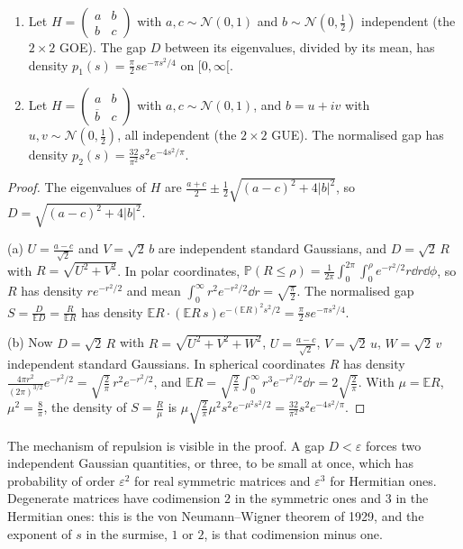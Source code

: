 \begin{proposition}\label{moments:prop:surmise}
\begin{enumerate}[label=(\alph*)]
\item Let $H=\begin{pmatrix}a&b\\b&c\end{pmatrix}$ with $a,c\sim\mathcal N(0,1)$ and $b\sim\mathcal N(0,\frac12)$ independent (the $2\times2$ GOE). The gap $D$ between its
eigenvalues, divided by its mean, has density $p_1(s)=\frac\pi2se^{-\pi s^2/4}$ on $[0,\infty[$.
\item Let $H=\begin{pmatrix}a&b\\\overline b&c\end{pmatrix}$ with $a,c\sim\mathcal N(0,1)$, and $b=u+iv$ with $u,v\sim\mathcal N(0,\frac12)$, all independent (the $2\times2$ GUE).
The normalised gap has density $p_2(s)=\frac{32}{\pi^2}s^2e^{-4s^2/\pi}$.
\end{enumerate}
\end{proposition}
\begin{proof}
The eigenvalues of $H$ are $\frac{a+c}2\pm\frac12\sqrt{(a-c)^2+4|b|^2}$, so $D=\sqrt{(a-c)^2+4|b|^2}$.

(a) $U=\frac{a-c}{\sqrt2}$ and $V=\sqrt2\,b$ are independent standard Gaussians, and $D=\sqrt2\,R$ with $R=\sqrt{U^2+V^2}$. In polar coordinates,
$\mathbb P(R\le\rho)=\frac1{2\pi}\int_0^{2\pi}\!\!\int_0^\rho e^{-r^2/2}r\dd r\dd\phi$, so $R$ has density $re^{-r^2/2}$ and mean
$\int_0^\infty r^2e^{-r^2/2}\dd r=\sqrt{\frac\pi2}$. The normalised gap $S=\frac D{\mathbb ED}=\frac R{\mathbb ER}$ has density
$\mathbb ER\cdot(\mathbb ER\,s)e^{-(\mathbb ER)^2s^2/2}=\frac\pi2se^{-\pi s^2/4}$.

(b) Now $D=\sqrt2\,R$ with $R=\sqrt{U^2+V^2+W^2}$, $U=\frac{a-c}{\sqrt2}$, $V=\sqrt2\,u$, $W=\sqrt2\,v$ independent standard Gaussians. In spherical coordinates
$R$ has density $\frac{4\pi r^2}{(2\pi)^{3/2}}e^{-r^2/2}=\sqrt{\frac2\pi}\,r^2e^{-r^2/2}$, and $\mathbb ER=\sqrt{\frac2\pi}\int_0^\infty r^3e^{-r^2/2}\dd r=2\sqrt{\frac2\pi}$. With
$\mu=\mathbb ER$, $\mu^2=\frac8\pi$, the density of $S=\frac R\mu$ is $\mu\sqrt{\frac2\pi}\mu^2s^2e^{-\mu^2s^2/2}=\frac{32}{\pi^2}s^2e^{-4s^2/\pi}$.
\end{proof}

The mechanism of repulsion is visible in the proof. A gap $D<\varepsilon$ forces two independent Gaussian quantities, or three, to be small at once,
which has probability of order $\varepsilon^2$ for real symmetric matrices and $\varepsilon^3$ for Hermitian ones. Degenerate matrices have codimension $2$
in the symmetric ones and $3$ in the Hermitian ones: this is the von Neumann--Wigner theorem of 1929, and the exponent of $s$ in the surmise, $1$ or $2$, is
that codimension minus one.

